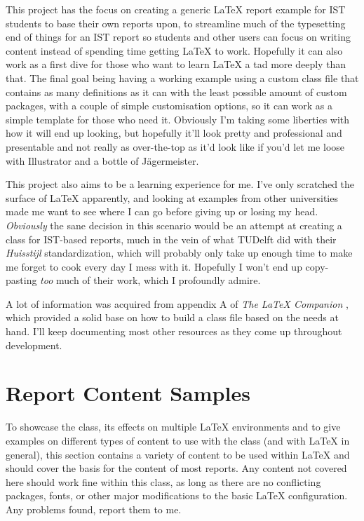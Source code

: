\documentclass[palatino,english]{ist-report}
\begin{document}
This project has the focus on creating a generic \LaTeX{} report example for IST students to base their own reports upon, to streamline much of the typesetting end of things for an IST report so students and other users can focus on writing content instead of spending time getting \LaTeX{} to work. Hopefully it can also work as a first dive for those who want to learn \LaTeX{} a tad more deeply than that. The final goal being having a working example using a custom class file that contains as many definitions as it can with the least possible amount of custom packages, with a couple of simple customisation options, so it can work as a simple template for those who need it. Obviously I'm taking some liberties with how it will end up looking, but hopefully it'll look pretty and professional and presentable and not really as over-the-top as it'd look like if you'd let me loose with Illustrator and a bottle of Jägermeister.

This project also aims to be a learning experience for me. I've only scratched the surface of \LaTeX{} apparently, and looking at examples from other universities made me want to see where I can go before giving up or losing my head. \emph{Obviously} the sane decision in this scenario would be an attempt at creating a class for IST-based reports, much in the vein of what TUDelft did with their \textit{Huisstijl} standardization, which will probably only take up enough time to make me forget to cook every day I mess with it. Hopefully I won't end up copy-pasting \emph{too} much of their work, which I profoundly admire.

A lot of information was acquired from appendix A of \textit{The \LaTeX{} Companion} \cite{latex-companion}, which provided a solid base on how to build a class file based on the needs at hand. I'll keep documenting most other resources as they come up throughout development.

\section{Report Content Samples}

To showcase the class, its effects on multiple \LaTeX{} environments and to give examples on different types of content to use with the class (and with \LaTeX{} in general), this section contains a variety of content to be used within \LaTeX{} and should cover the basis for the content of most reports. Any content not covered here should work fine within this class, as long as there are no conflicting packages, fonts, or other major modifications to the basic \LaTeX{} configuration. Any problems found, report them to me.
\end{document}

